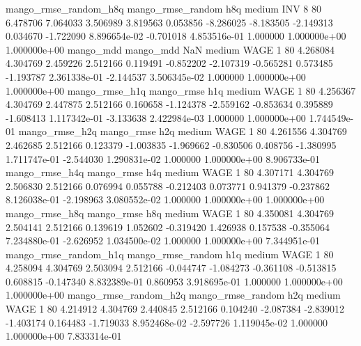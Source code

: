 mango_rmse_random_h8q mango_rmse_random                  h8q     medium      INV                 8 80  6.478706       7.064033 3.506989       3.819563    0.053856     -8.286025     -8.183505    -2.149313       0.034670 -1.722090 8.896654e-02    -0.701018   4.853516e-01            1.000000    1.000000e+00        1.000000e+00
            mango_mdd         mango_mdd                  NaN     medium     WAGE                 1 80  4.268084       4.304769 2.459226       2.512166    0.119491     -0.852202     -2.107319    -0.565281       0.573485 -1.193787 2.361338e-01    -2.144537   3.506345e-02            1.000000    1.000000e+00        1.000000e+00
       mango_rmse_h1q        mango_rmse                  h1q     medium     WAGE                 1 80  4.256367       4.304769 2.447875       2.512166    0.160658     -1.124378     -2.559162    -0.853634       0.395889 -1.608413 1.117342e-01    -3.133638   2.422984e-03            1.000000    1.000000e+00        1.744549e-01
       mango_rmse_h2q        mango_rmse                  h2q     medium     WAGE                 1 80  4.261556       4.304769 2.462685       2.512166    0.123379     -1.003835     -1.969662    -0.830506       0.408756 -1.380995 1.711747e-01    -2.544030   1.290831e-02            1.000000    1.000000e+00        8.906733e-01
       mango_rmse_h4q        mango_rmse                  h4q     medium     WAGE                 1 80  4.307171       4.304769 2.506830       2.512166    0.076994      0.055788     -0.212403     0.073771       0.941379 -0.237862 8.126038e-01    -2.198963   3.080552e-02            1.000000    1.000000e+00        1.000000e+00
       mango_rmse_h8q        mango_rmse                  h8q     medium     WAGE                 1 80  4.350081       4.304769 2.504141       2.512166    0.139619      1.052602     -0.319420     1.426938       0.157538 -0.355064 7.234880e-01    -2.626952   1.034500e-02            1.000000    1.000000e+00        7.344951e-01
mango_rmse_random_h1q mango_rmse_random                  h1q     medium     WAGE                 1 80  4.258094       4.304769 2.503094       2.512166   -0.044747     -1.084273     -0.361108    -0.513815       0.608815 -0.147340 8.832389e-01     0.860953   3.918695e-01            1.000000    1.000000e+00        1.000000e+00
mango_rmse_random_h2q mango_rmse_random                  h2q     medium     WAGE                 1 80  4.214912       4.304769 2.440845       2.512166    0.104240     -2.087384     -2.839012    -1.403174       0.164483 -1.719033 8.952468e-02    -2.597726   1.119045e-02            1.000000    1.000000e+00        7.833314e-01
